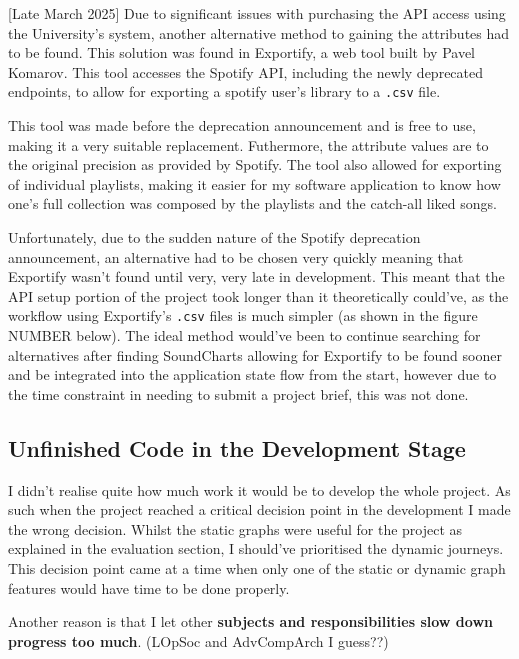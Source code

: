 [Late March 2025] Due to significant issues with purchasing the API access using the University's system, another alternative method to gaining the attributes had to be found. This solution was found in Exportify, a web tool built by Pavel Komarov. This tool accesses the Spotify API, including the newly deprecated endpoints, to allow for exporting a spotify user's library to a \lstinline|.csv| file.

This tool was made before the deprecation announcement and is free to use, making it a very suitable replacement. Futhermore, the attribute values are to the original precision as provided by Spotify. The tool also allowed for exporting of individual playlists, making it easier for my software application to know how one's full collection was composed by the playlists and the catch-all liked songs.

Unfortunately, due to the sudden nature of the Spotify deprecation announcement, an alternative had to be chosen very quickly meaning that Exportify wasn't found until very, very late in development. This meant that the API setup portion of the project took longer than it theoretically could've, as the workflow using Exportify's \lstinline|.csv| files is much simpler (as shown in the figure NUMBER below). The ideal method would've been to continue searching for alternatives after finding SoundCharts allowing for Exportify to be found sooner and be integrated into the application state flow from the start, however due to the time constraint in needing to submit a project brief, this was not done.%

\subsection{Unfinished Code in the Development Stage}
I didn't realise quite how much work it would be to develop the whole project. As such when the project reached a critical decision point in the development I made the wrong decision. Whilst the static graphs were useful for the project as explained in the evaluation section, I should've prioritised the dynamic journeys. This decision point came at a time when only one of the static or dynamic graph features would have time to be done properly.

Another reason is that I let other \textbf{subjects and responsibilities slow down progress too much}. (LOpSoc and AdvCompArch I guess??)

